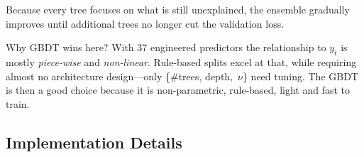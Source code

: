 Because every tree focuses on what is still unexplained, the ensemble
gradually improves until additional trees no longer cut the validation loss.


Why GBDT wins here? With 37 engineered predictors the relationship to $y_t$ is mostly
\textit{piece-wise} and \textit{non-linear}. Rule-based splits excel at that,
while requiring almost no architecture design—only \{\#trees, depth,~$\nu$\}
need tuning. The GBDT is then a good choice because it is non-parametric, rule-based, 
light and fast to train.




\subsection{Implementation Details}









